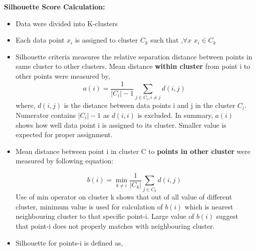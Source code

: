 \documentclass[preprint,12pt]{elsarticle}
\begin{document}
				
					 
					 
\textbf{Silhouette Score Calculation:}\cite{Silhouettes} \cite{recovering}
					 \begin{itemize}
					 	\item Data were divided into K-clusters
					 	\item Each data point $x_i$ is assigned to cluster $C_{k}$ such that ,$\forall x $ $x_i \in C_k$
					 	\item Silhouette criteria measures the relative separation distance between points in same cluster to other clusters. Mean distance \textbf{within cluster} from point i to other points were measured by,
					 	\begin{equation}
								a(i) = \frac{1}{|C_i| - 1} \sum_{j \in C_i, i \neq j} d(i, j)
					 	\end{equation}
					 	where, $d(i,j)$ is the distance between data points  i and j in the cluster $ C_i$. Numerator contains $|C_i|-  1$ as $d(i,i)$ is excluded. In summary, $a(i)$ shows  how well data point i is assigned to its cluster. Smaller value is expected for proper assignment.
					 	\item Mean distance between point i in cluster C to \textbf{points in other cluster} were measured by following equation:
					 	
					 	\begin{equation}
								b(i) = \min_{k \neq i} \frac{1}{|C_k|} \sum_{j \in C_k} d(i, j)
					 	\end{equation}
					 	Use of min operator on cluster k shows that out of all value of different cluster, minimum value is used for calculation of $b(i)$ which is nearest neighbouring cluster to that specific point-i. Large value of $b(i)$ suggest that point-i does not properly matches with neighbouring cluster.
					 	\item Silhouette for points-i is defined as,
					 	

\end{itemize}
\end{document}
